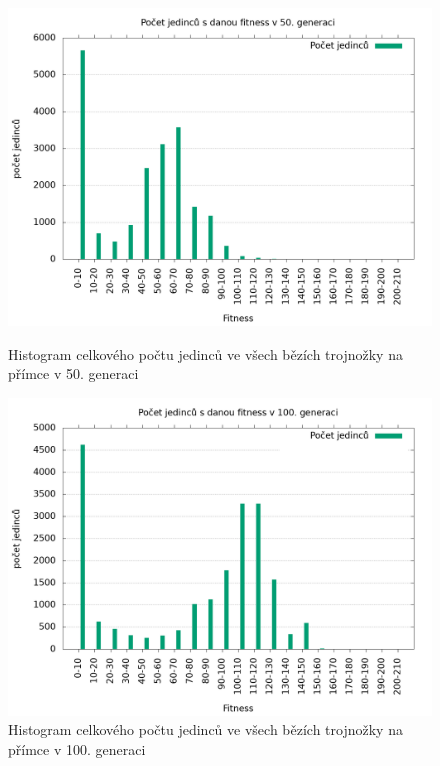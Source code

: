\begin{figure}[h]
    \begin{minipage}[c]{0.48\linewidth}
        \includegraphics[width=\linewidth]{obrazky/trojnozka_primka_fitnessHistogram50.png}
        \caption{Histogram celkového počtu jedinců ve všech bězích trojnožky na přímce v 50. generaci}
    \end{minipage}
    \hfill
    \begin{minipage}[c]{0.48\linewidth}
        \includegraphics[width=\linewidth]{obrazky/trojnozka_primka_fitnessHistogram100.png}
        \caption{Histogram celkového počtu jedinců ve všech bězích trojnožky na přímce v 100. generaci}
    \end{minipage}
\end{figure}

